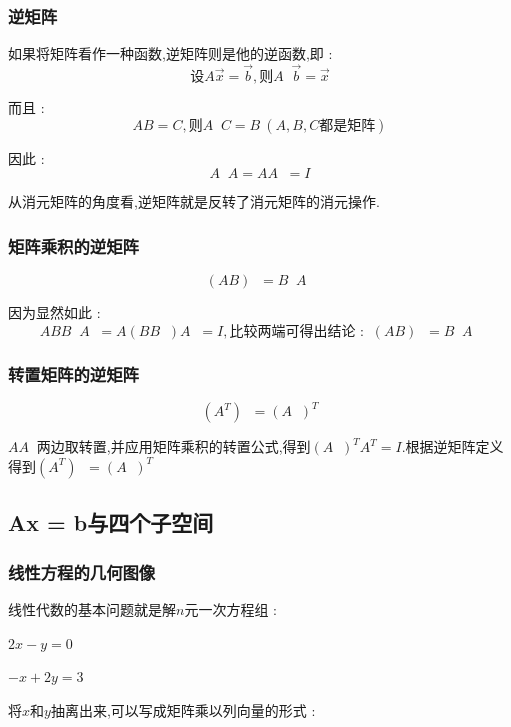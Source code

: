 \documentclass[UTF8,12pt]{ctexbook}
\newcommand{\transpose}{^T}
\DeclareMathOperator{\inverse}{^{-1}}
\begin{document}
{{{{  \subsubsection{逆矩阵}{
    如果将矩阵看作一种函数,逆矩阵则是他的逆函数,即 :
    $$
      \mbox{设}A\vec{x} = \vec{b},\mbox{则}A\inverse\vec{b} = \vec{x}
    $$

    而且 :
    $$
      AB = C,\mbox{则}A\inverse C = B\ (A,B,C\mbox{都是矩阵})
    $$

    因此 :
    $$
      A\inverse A = AA\inverse = I
    $$

    从消元矩阵的角度看,逆矩阵就是反转了消元矩阵的消元操作.
  }%

  \subsubsection{矩阵乘积的逆矩阵}{
    $$
      (AB)\inverse = B\inverse A\inverse
    $$

    因为显然如此 :
    $$
      ABB\inverse A\inverse = A(BB\inverse)A\inverse = I,\mbox{比较两端可得出结论 : }\ (AB)\inverse = B\inverse A\inverse
    $$
  }%

  \subsubsection{转置矩阵的逆矩阵}{
    $$
      (A\transpose)\inverse = (A\inverse)\transpose
    $$

    $AA\inverse$两边取转置,并应用矩阵乘积的转置公式,得到$(A\inverse)\transpose A\transpose = I$.根据逆矩阵定义得到$(A\transpose)\inverse = (A\inverse)\transpose$
  }%

}%

\subsection{Ax = b与四个子空间}{

\subsubsection{线性方程的几何图像}{
  线性代数的基本问题就是解$n$元一次方程组 :

  \begin{center}
    $2x - y = 0$

    $-x + 2y = 3$
  \end{center}

  将$x$和$y$抽离出来,可以写成矩阵乘以列向量的形式 :

}}}}}
\end{document}
